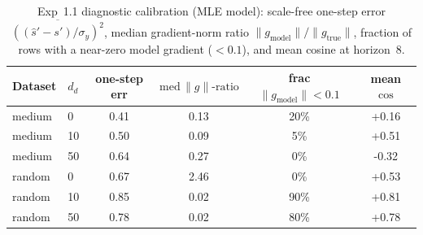 \begin{table}[htbp]
\centering
\caption{Exp~1.1 diagnostic calibration (MLE model): scale-free one-step error $\overline{((\hat s'-s')/\sigma_y)^2}$, median gradient-norm ratio $\|\!g_{\text{model}}\!\|/\|\!g_{\text{true}}\!\|$, fraction of rows with a near-zero model gradient ($<0.1$), and mean cosine at horizon~8.}
\label{tab:h11quality}
\begin{tabular}{llcccc}
\toprule
Dataset & $d_d$ & one-step err & $\text{med}\,\|\!g\|\text{-ratio}$ & frac $\|\!g_{\text{model}}\!\|<0.1$ & mean $\cos$ \\
\midrule
medium & 0 & 0.41 & 0.13 & 20\% & +0.16 \\
medium & 10 & 0.50 & 0.09 & 5\% & +0.51 \\
medium & 50 & 0.64 & 0.27 & 0\% & -0.32 \\
random & 0 & 0.67 & 2.46 & 0\% & +0.53 \\
random & 10 & 0.85 & 0.02 & 90\% & +0.81 \\
random & 50 & 0.78 & 0.02 & 80\% & +0.78 \\
\bottomrule
\end{tabular}
\end{table}
